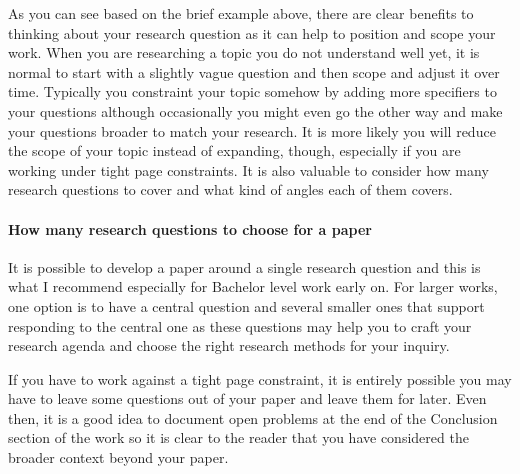 As you can see based on the brief example above, there are clear benefits to thinking about your research question as it can help to position and scope your work.
When you are researching a topic you do not understand well yet, it is normal to start with a slightly vague question and then scope and adjust it over time.
Typically you constraint your topic somehow by adding more specifiers to your questions although occasionally you might even go the other way and make your questions broader to match your research.
It is more likely you will reduce the scope of your topic instead of expanding, though, especially if you are working under tight page constraints.
It is also valuable to consider how many research questions to cover and what kind of angles each of them covers.

\paragraph{How many research questions to choose for a paper}

It is possible to develop a paper around a single research question and this is what I recommend especially for Bachelor level work early on.
For larger works, one option is to have a central question and several smaller ones that support responding to the central one as these questions may help you to craft your research agenda and choose the right research methods for your inquiry.

If you have to work against a tight page constraint, it is entirely possible you may have to leave some questions out of your paper and leave them for later.
Even then, it is a good idea to document open problems at the end of the Conclusion section of the work so it is clear to the reader that you have considered the broader context beyond your paper.




